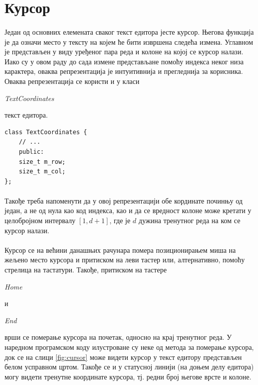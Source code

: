 \documentclass[12pt,oneside]{memoir}
\begin{document}
\section{Курсор}
\paragraph{}
Један од основних елемената сваког текст едитора јесте курсор. Његова функција је да
означи место у тексту на којем ће бити извршена следећа измена. Углавном је представљен у 
виду уређеног пара реда и колоне на којој се курсор налази. Иако су у овом раду до сада
измене представљане помоћу индекса неког низа карактера, оваква репрезентација је
интуитивнија и прегледнија за корисника. Оваква репрезентација се користи и
у класи \begin{latinica}\textit{TextCoordinates}\end{latinica} текст едитора.

\begin{verbatim}
class TextCoordinates {
	// ...
	public:
	size_t m_row;
	size_t m_col;
};
\end{verbatim}

\paragraph{}
Такође треба напоменути да у овој репрезентацији обе кординате починњу од
један, а не од нула као код индекса, као и да се вредност колоне може кретати
у целобројном интервалу \([1, d+1]\), где је \(d\) дужина тренутног реда на ком се
курсор налази.

\paragraph{}
Курсор се на већини данашњих рачунара помера позиционирањем миша на жељено место курсора
и притиском на леви тастер или, алтернативно, помоћу стрелица на тастатури. Такође, 
притиском на тастере \begin{latinica}\textit{Home}\end{latinica} и
\begin{latinica}\textit{End}\end{latinica} врши се померање курсора на почетак, односно на крај тренутног реда. У наредном програмском коду
илустроване су неке од метода за померање курсора, док се на слици \ref{fig:cursor}
може видети курсор у текст едитору представљен белом усправном цртом. Такође се
и у статусној линији (на доњем делу едитора) могу видети тренутне координате курсора,
тј. редни број његове врсте и колоне.
\end{document}
